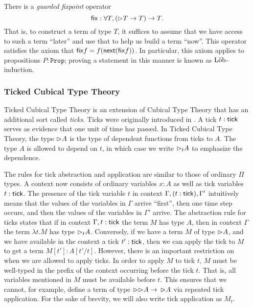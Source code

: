 
There is a \emph{guarded fixpoint} operator
%
\[
  \mathsf{fix} : \forall T, ({\vartriangleright} T \to T) \to T.
\]
%
That is, to construct a term of type $T$, it suffices to assume that we have
access to such a term ``later'' and use that to help us build a term ``now''.
This operator satisfies the axiom that $\mathsf{fix} f = f (\mathsf{next} (\mathsf{fix} f))$. In
particular, this axiom applies to propositions $P : \texttt{Prop}$; proving a
statement in this manner is known as $\text{L\"{o}b}$-induction.

\subsubsection{Ticked Cubical Type Theory}

Ticked Cubical Type Theory \cite{mogelberg-veltri2019} is an extension of
Cubical Type Theory \cite{CohenCoquandHuberMortberg2017} that has an additional
sort called \emph{ticks}. Ticks were originally introduced in
\cite{bahr-grathwohl-bugge-mogelberg2017}. A tick $t : \mathsf{tick}$ serves as evidence
that one unit of time has passed. In Ticked Cubical Type Theory, the type
${\vartriangleright} A$ is the type of dependent functions from ticks to $A$. The type $A$ is
allowed to depend on $t$, in which case we write ${\vartriangleright}_t A$ to emphasize the
dependence.



The rules for tick abstraction and application are similar to those of ordinary
$\Pi$ types. A context now consists of ordinary variables $x : A$ as well as
tick variables $t : \mathsf{tick}$. The presence of the tick variable $t$ in context
$\Gamma, (t : \mathsf{tick}), \Gamma'$ intuitively means that the values of the
variables in $\Gamma$ arrive ``first'', then one time step occurs, and then the
values of the variables in $\Gamma'$ arrive.
%
The abstraction rule for ticks states that if in context $\Gamma, t : \mathsf{tick}$
the term $M$ has type $A$, then in context $\Gamma$ the term $\lambda t.M$ has
type ${\vartriangleright}_t A$.
%
Conversely, if we have a term $M$ of type ${\vartriangleright} A$, and we have available in
the context a tick $t' : \mathsf{tick}$, then we can apply the tick to $M$ to get a
term $M[t'] : A[t'/t]$. However, there is an important restriction on when we
are allowed to apply ticks. In order to apply $M$ to tick $t$, $M$ must be
well-typed in the prefix of the context occurring before the tick $t$. That is,
all variables mentioned in $M$ must be available before $t$. This ensures that
we cannot, for example, define a term of type ${\vartriangleright} {{\vartriangleright}} A \to\, {{\vartriangleright}}
A$ via repeated tick application.
%
For the sake of brevity, we will also write tick application as $M_t$.

